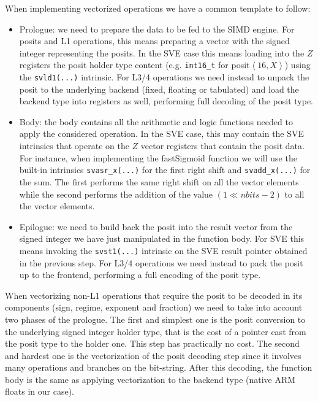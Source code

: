When implementing vectorized operations we have a common template to follow: 
\begin{itemize}
    \item Prologue: we need to prepare the data to be fed to the SIMD engine. For posits and L1 operations, this means preparing a vector with the signed integer representing the posits. In the SVE case this means loading into the $Z$ registers the posit holder type content (e.g. \texttt{int16\_t} for posit$\left<16,X\right>$) using the \texttt{svld1(...)} intrinsic. For L3/4 operations we need instead to unpack the posit to the underlying backend (fixed, floating or tabulated) and load the backend type into registers as well, performing full decoding of the posit type.
    \item Body: the body contains all the arithmetic and logic functions needed to apply the considered operation. In the SVE case, this may contain the SVE intrinsics that operate on the $Z$ vector registers that contain the posit data. For instance, when implementing the fastSigmoid function we will use the built-in intrinsics \texttt{svasr\_x(...)} for the first right shift and \texttt{sv\-add\_x(...)} for the sum. The first performs the same right shift on all the vector elements while the second performs the addition of the value $(1\ll nbits-2)$ to all the vector elements.
    \item Epilogue: we need to build back the posit into the result vector from the signed integer we have just manipulated in the function body. For SVE this means invoking the \texttt{svst1(...)} intrinsic on the SVE result pointer obtained in the previous step. For L3/4 operations we need instead to pack the posit up to the frontend, performing a full encoding of the posit type.
\end{itemize}

When vectorizing non-L1 operations that require the posit to be decoded in its components (sign, regime, exponent and fraction) we need to take into account two phases of the prologue. The first and simplest one is the posit conversion to the underlying signed integer holder type, that is the cost of a pointer cast from the posit type to the holder one. This step has practically no cost. The second and hardest one is the vectorization of the posit decoding step since it involves many operations and branches on the bit-string. After this decoding, the function body is the same as applying vectorization to the backend type (native ARM floats in our case).


